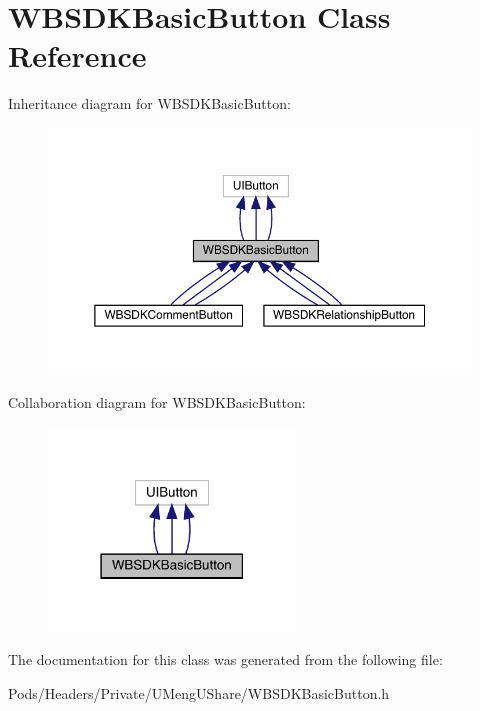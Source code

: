\hypertarget{interface_w_b_s_d_k_basic_button}{}\section{W\+B\+S\+D\+K\+Basic\+Button Class Reference}
\label{interface_w_b_s_d_k_basic_button}


Inheritance diagram for W\+B\+S\+D\+K\+Basic\+Button\+:\nopagebreak
\begin{figure}[H]
\begin{center}
\leavevmode
\includegraphics[width=350pt]{interface_w_b_s_d_k_basic_button__inherit__graph}
\end{center}
\end{figure}


Collaboration diagram for W\+B\+S\+D\+K\+Basic\+Button\+:\nopagebreak
\begin{figure}[H]
\begin{center}
\leavevmode
\includegraphics[width=186pt]{interface_w_b_s_d_k_basic_button__coll__graph}
\end{center}
\end{figure}


The documentation for this class was generated from the following file\+:\begin{DoxyCompactItemize}
\item 
Pods/\+Headers/\+Private/\+U\+Meng\+U\+Share/W\+B\+S\+D\+K\+Basic\+Button.\+h\end{DoxyCompactItemize}
